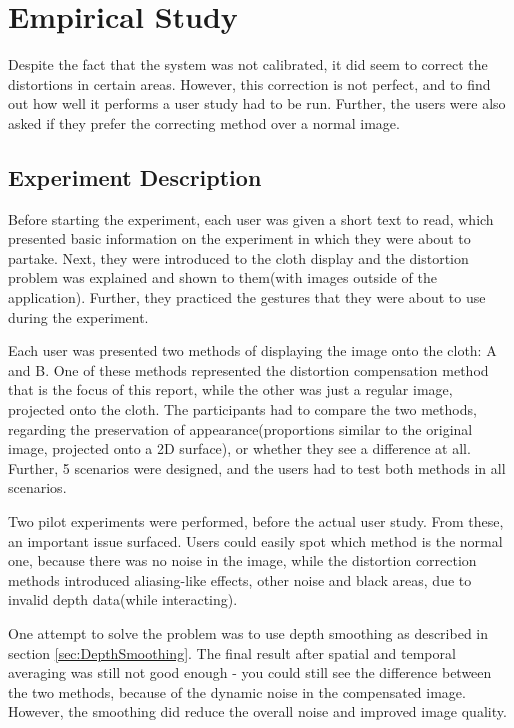 \documentclass[]{article}
\begin{document}
\clearpage
\section{Empirical Study}
\label{sec:EmpiricalStudy}

Despite the fact that the system was not calibrated, it did seem to correct the distortions in certain areas. However, this correction is not perfect, and to find out how well it performs a user study had to be run. Further, the users were also asked if they prefer the correcting method over a normal image.

\subsection{Experiment Description}

Before starting the experiment, each user was given a short text to read, which presented basic information on the experiment in which they were about to partake. Next, they were introduced to the cloth display and the distortion problem was explained and shown to them(with images outside of the application). Further, they practiced the gestures that they were about to use during the experiment. 

Each user was presented two methods of displaying the image onto the cloth: A and B. One of these methods represented the distortion compensation method that is the focus of this report, while the other was just a regular image, projected onto the cloth. The participants had to compare the two methods, regarding the preservation of appearance(proportions similar to the original image, projected onto a 2D surface), or whether they see a difference at all. Further, 5 scenarios were designed, and the users had to test both methods in all scenarios. 

Two pilot experiments were performed, before the actual user study. From these, an important issue surfaced. Users could easily spot which method is the normal one, because there was no noise in the image, while the distortion correction methods introduced aliasing-like effects, other noise and black areas, due to invalid depth data(while interacting). 

One attempt to solve the problem was to use depth smoothing as described in section \ref{sec:DepthSmoothing}. The final result after spatial and temporal averaging was still not good enough - you could still see the difference between the two methods, because of the dynamic noise in the compensated image. However, the smoothing did reduce the overall noise and improved image quality. 
\end{document}
